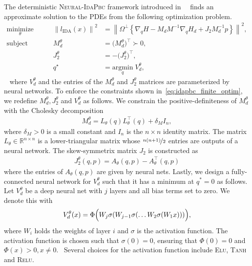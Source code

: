 The deterministic \textsc{Neural-IdaPbc} framework introduced
in~\cite{neuralidapbc}~ finds an approximate solution to the PDEs from the
following optimization problem.
\begin{equation}
  \begin{aligned}
      \underset{\theta }{\textrm{minimize}} 
      &&\quad \left\| l_{\textrm{IDA}} (x) \right\|^2 &= \left\| \Omega^\perp \left\{ \nabla_qH - M_dM^{-1} \nabla_qH_d + J_2M_d^{-1}p \right\} \right\|^2, \\
      \textrm{subject to}
      &&\quad M_d^\theta &= \big( M_d^\theta \big)^\top \succ 0, \\
      &&\quad J_2^\theta &= -\big( J_2^\theta \big)^\top, \\
      &&\quad q^\star &= \underset{q}{\textrm{argmin}}\; V_d^\theta,
  \end{aligned}    
  \label{eq:idapbc_finite_optim}%
\end{equation}~
where $V^\theta_d$ and the entries of the $M^\theta_d$ and $J^\theta_2$ matrices
are parameterized by neural networks. 
%
To enforce the constraints shown in~\eqref{eq:idapbc_finite_optim}, we redefine
$M^\theta_d, J^\theta_2$ and $V^\theta_d$ as follows.
%
We constrain the positive-definiteness of $M^\theta_d$ with the Cholesky
decomposition~ 
\begin{align*}
  M^\theta_d = L_{\theta}(q)L_{\theta}^\top(q) + \delta_M I_n,
\end{align*}
\noindent where $\delta_M > 0$ is a small constant and $I_n$ is the $n \times n$
identity matrix.
%
The matrix $L_{\theta} \in \mathbb{R}^{n \times n}$ is a lower-triangular matrix
whose $\nicefrac{n(n+1)}{2}$ entries are outputs of a neural network. 
%
The skew-symmetrix matrix $J_2$ is constructed as 
\begin{align*}
  J_2^\theta(q, p) = A_\theta(q, p) - A^\top_\theta(q, p)
\end{align*}
\noindent where the entries of $A_{\theta}(q, p)$ are given by neural nets.
%
Lastly, we design a fully-connected neural network for $V^\theta_d$ such that it
has a minimum at $q^*=0$ as follows.
%
Let $V^\theta_d$ be a deep neural net with $j$ layers and all bias terms set to
zero. We denote this with
\begin{equation}
  V_d^\theta(x) = \Phi \Bigl( W_j\sigma(W_{j-1}\sigma(\ldots W_2\sigma(W_1x))) \Bigr),
  \label{eq:Vdnet_constraint}
\end{equation}
\noindent where $W_i$ holds the weights of layer $i$ and $\sigma$ is the activation function.
%
The activation function is chosen such that $\sigma(0) = 0$, ensuring that
$\Phi(0) = 0$ and $\Phi(x) > 0, x \ne 0$.~
%
Several choices for the activation function include \textsc{Elu}, \textsc{Tanh} and \textsc{Relu}.
%


